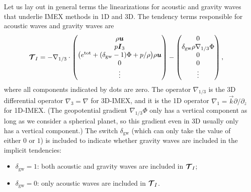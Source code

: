 \documentclass{report}
\numberwithin{equation}{section}
\begin{document}
Let us lay out in general terms the linearizations for acoustic and gravity waves that underlie IMEX methods in 1D and 3D. The tendency terms responsible for acoustic waves and gravity waves are
 \begin{equation}
 \boldsymbol{{\mathcal{T}}}_{I}= -\nabla_{1/3} \cdot
 \begin{pmatrix}
 \rho \boldsymbol{{u}} \\
 p \boldsymbol{{I}}_3 \\
 \bigl(e^{\mathrm{tot}} + (\delta_{\mathrm{gw}}-1) \Phi + p/\rho \bigr) \rho \boldsymbol{{u}} \\
 0\\
 \vdots
 \end{pmatrix}
 - \begin{pmatrix}
 0 \\
 \delta_{\mathrm{gw}} \rho \nabla_{1/3} \Phi \\
 0\\
 0\\
 \vdots
 \end{pmatrix},
 \label{eq:3d-imex/tendencies}
 \end{equation}
where all components indicated by dots are zero. The operator $\nabla_{1/3}$ is the 3D differential operator $\nabla_3 = \nabla$ for 3D-IMEX, and it is the 1D operator $\nabla_1 = \vec{k} \partial/\partial_z$ for 1D-IMEX. (The geopotential gradient $\nabla_{1/3} \Phi$ only has a vertical component as long as we consider a spherical planet, so this gradient even in 3D usually only has a vertical component.) The switch $\delta_{\mathrm{gw}}$ (which can only take the value of either $0$ or $1$) is included to indicate whether gravity waves are included in the implicit tendencies: 
\begin{itemize}
    \item $\delta_{\mathrm{gw}}=1$: both acoustic and gravity waves are included in $\boldsymbol{{\mathcal{T}}}_I$;
    \item $\delta_{\mathrm{gw}}=0$: only acoustic waves are included in $\boldsymbol{{\mathcal{T}}}_I$.
\end{itemize}
\end{document}
